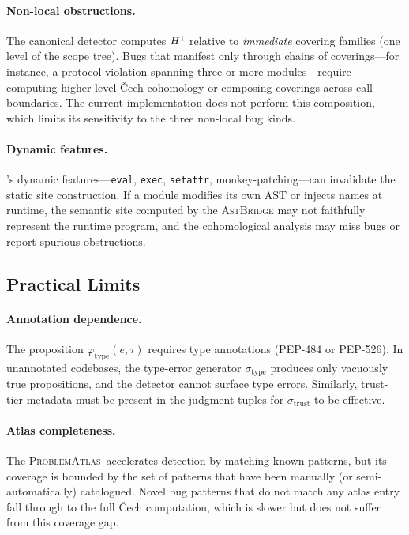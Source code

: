 \documentclass[11pt]{article}
\newcommand{\ProbAtlas}{\textsc{ProblemAtlas}}    %
\newcommand{\bugtype}{\sigma_{\mathrm{type}}}     %
\newcommand{\bugtrust}{\sigma_{\mathrm{trust}}}   %
\begin{document}
\paragraph{Non-local obstructions.}
The canonical detector computes $H^{1}$ relative to \emph{immediate}
covering families (one level of the scope tree).  Bugs that manifest
only through chains of coverings---for instance, a protocol violation
spanning three or more modules---require computing higher-level \v{C}ech
cohomology or composing coverings across call boundaries.  The current
implementation does not perform this composition, which limits its
sensitivity to the three non-local bug kinds.

\paragraph{Dynamic features.}
\Python's dynamic features---\texttt{eval}, \texttt{exec},
\texttt{setattr}, monkey-patching---can invalidate the static
site construction.  If a module modifies its own AST or injects
names at runtime, the semantic site computed by the \textsc{AstBridge}
may not faithfully represent the runtime program, and the cohomological
analysis may miss bugs or report spurious obstructions.

\subsection{Practical Limits}

\paragraph{Annotation dependence.}
The proposition $\varphi_{\mathrm{type}}(e,\tau)$ requires
type annotations (PEP-484 or PEP-526).  In unannotated codebases,
the type-error generator $\bugtype$ produces only vacuously true
propositions, and the detector cannot surface type errors.
Similarly, trust-tier metadata must be present in the judgment tuples
for $\bugtrust$ to be effective.

\paragraph{Atlas completeness.}
The \ProbAtlas\ accelerates detection by matching known patterns, but
its coverage is bounded by the set of patterns that have been
manually (or semi-automatically) catalogued.  Novel bug patterns
that do not match any atlas entry fall through to the full
\v{C}ech computation, which is slower but does not suffer from
this coverage gap.
\end{document}
